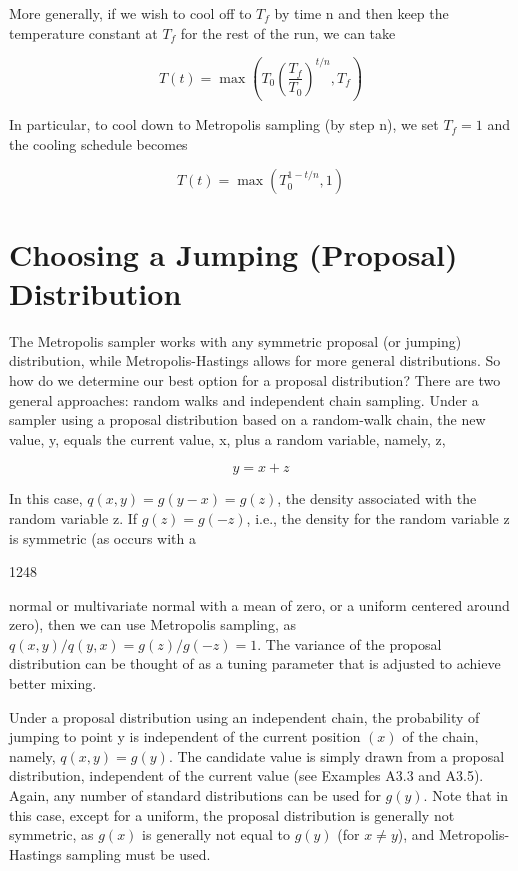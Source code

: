 \documentclass{article}
\begin{document}
More generally, if we wish to cool off to  $ T_{f} $ by time n and then keep the temperature constant at  $ T_{f} $ for the rest of the run, we can take

\begin{equation}
T(t)=\max\left(T_{0}\left(\frac{T_{f}}{T_{0}}\right)^{t/n},T_{f}\right)
\end{equation}

In particular, to cool down to Metropolis sampling (by step n), we set  $ T_{f} = 1 $ and the cooling schedule becomes

\begin{equation}
T(t)=\max\left(T_{0}^{1-t/n},1\right)
\end{equation}

\section{Choosing a Jumping (Proposal) Distribution}
The Metropolis sampler works with any symmetric proposal (or jumping) distribution, while Metropolis-Hastings allows for more general distributions. So how do we determine our best option for a proposal distribution? There are two general approaches: random walks and independent chain sampling. Under a sampler using a proposal distribution based on a random-walk chain, the new value, y, equals the current value, x, plus a random variable, namely, z,

\begin{equation}
y=x+z
\end{equation}

In this case,  $ q(x, y) = g(y - x) = g(z) $, the density associated with the random variable z. If  $ g(z) = g(-z) $, i.e., the density for the random variable z is symmetric (as occurs with a

1248

normal or multivariate normal with a mean of zero, or a uniform centered around zero), then we can use Metropolis sampling, as  $ q(x,y)/q(y,x) = g(z)/g(-z) = 1 $. The variance of the proposal distribution can be thought of as a tuning parameter that is adjusted to achieve better mixing.

Under a proposal distribution using an independent chain, the probability of jumping to point y is independent of the current position  $ (x) $ of the chain, namely,  $ q(x,y) = g(y) $. The candidate value is simply drawn from a proposal distribution, independent of the current value (see Examples A3.3 and A3.5). Again, any number of standard distributions can be used for  $ g(y) $. Note that in this case, except for a uniform, the proposal distribution is generally not symmetric, as  $ g(x) $ is generally not equal to  $ g(y) $ (for  $ x \neq y $), and Metropolis-Hastings sampling must be used.
\end{document}
